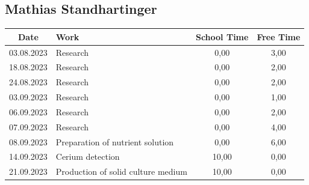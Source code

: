 \newpage

\subsection{Mathias Standhartinger}

\begin{longtable}{|c|p{7cm}|c|c|}
    \hline
    \textbf{Date} & \textbf{Work}                                                                                                   & \textbf{School Time} & \textbf{Free Time} \\ \endhead \hline
    03.08.2023    & Research                                                                                                        & 0,00                 & 3,00              \\ \hline
    18.08.2023    & Research                                                                                                        & 0,00                 & 2,00              \\ \hline
    24.08.2023    & Research                                                                                                        & 0,00                 & 2,00              \\ \hline
    03.09.2023    & Research                                                                                                        & 0,00                 & 1,00              \\ \hline
    06.09.2023    & Research                                                                                                        & 0,00                 & 2,00              \\ \hline
    07.09.2023    & Research                                                                                                        & 0,00                 & 4,00              \\ \hline
    08.09.2023    & Preparation of nutrient solution                                                                                & 0,00                 & 6,00              \\ \hline
    14.09.2023    & Cerium detection                                                                                                & 10,00                & 0,00              \\ \hline
    21.09.2023    & Production of solid culture medium                                                                              & 10,00                & 0,00              \\ \hline

\end{longtable}
